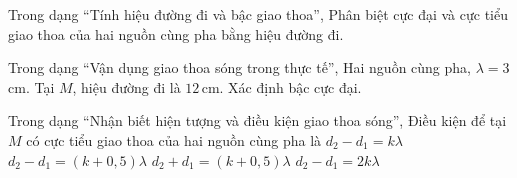 \begin{ex}
Trong dạng “Tính hiệu đường đi và bậc giao thoa”, Phân biệt cực đại và cực tiểu giao thoa của hai nguồn cùng pha bằng hiệu đường đi.
\choiceTF

\end{ex}

\begin{ex}
Trong dạng “Vận dụng giao thoa sóng trong thực tế”, Hai nguồn cùng pha, $\lambda=3$ cm. Tại $M$, hiệu đường đi là $12\,\text{cm}$. Xác định bậc cực đại.
\end{ex}

\begin{ex}
Trong dạng “Nhận biết hiện tượng và điều kiện giao thoa sóng”, Điều kiện để tại $M$ có cực tiểu giao thoa của hai nguồn cùng pha là
\choice
{$d_2-d_1=k\lambda$}
{\True $d_2-d_1=(k+0,5)\lambda$}
{$d_2+d_1=(k+0,5)\lambda$}
{$d_2-d_1=2k\lambda$}
\end{ex}

